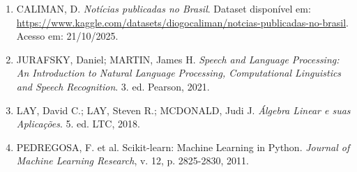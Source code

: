\documentclass[a4paper, 12pt]{article}
\begin{document}
\begin{enumerate}
\item CALIMAN, D. \textit{Notícias publicadas no Brasil}. Dataset disponível em: \url{https://www.kaggle.com/datasets/diogocaliman/notcias-publicadas-no-brasil}. Acesso em: 21/10/2025.
\item JURAFSKY, Daniel; MARTIN, James H. \textit{Speech and Language Processing: An Introduction to Natural Language Processing, Computational Linguistics and Speech Recognition}. 3. ed. Pearson, 2021.
\item LAY, David C.; LAY, Steven R.; MCDONALD, Judi J. \textit{Álgebra Linear e suas Aplicações}. 5. ed. LTC, 2018.
\item PEDREGOSA, F. et al. Scikit-learn: Machine Learning in Python. \textit{Journal of Machine Learning Research}, v. 12, p. 2825-2830, 2011.
\end{enumerate}
\end{document}
